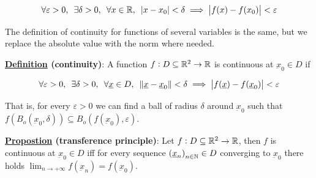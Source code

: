 \documentclass[10pt]{extarticle}
\renewcommand{\vec}[1]{\underbar{\ensuremath{#1}}}
\begin{document}
$$
    \forall \varepsilon > 0, \enspace \exists \delta > 0, \enspace \forall x \in \mathbb{R}, \enspace \abs{x - x_0} < \delta \implies \abs{f(x) - f(x_0)} < \varepsilon
$$

The definition of continuity for functions of several variables is the same, but we replace the absolute value with the norm where needed.

\textbf{\underline{Definition} (continuity)}: A function $f: D \subseteq \mathbb{R}^2 \to \mathbb{R}$ is continuous at $\vec{x}_0 \in D$ if

$$
    \forall \varepsilon > 0, \enspace \exists \delta > 0, \enspace \forall \vec{x} \in D, \enspace \norm{\vec{x} - \vec{x}_0} < \delta \implies \abs{f(\vec{x}) - f(\vec{x}_0)} < \varepsilon
$$

That is, for every $\varepsilon > 0$ we can find a ball of radius $\delta$ around $\vec{x}_0$ such that $f(B_o(\vec{x}_0, \delta)) \subseteq B_o(f(\vec{x}_0), \varepsilon)$.

\textbf{\underline{Propostion} (transference principle)}:
Let $f: D \subseteq \mathbb{R}^2 \to \mathbb{R}$, then $f$ is continuous at $\vec{x}_0 \in D$ iff for every sequence $\left(\vec{x}_n\right)_{n \in \N} \in D$ converging to $\vec{x}_0$ there holds $\lim_{n \to +\infty} f(\vec{x}_n) = f(\vec{x}_0)$.
\end{document}
